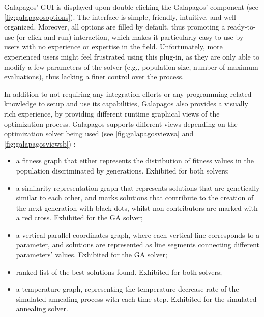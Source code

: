 	Galapagos' \ac{GUI} is displayed upon double-clicking the Galapagos' component (see \cref{fig:galapagosoptions}). The interface is simple, friendly, intuitive, and well-organized. Moreover, all options are filled by default, thus promoting a ready-to-use (or click-and-run) interaction, which makes it particularly easy to use by users with no experience or expertise in the field. Unfortunately, more experienced users might feel frustrated using this plug-in, as they are only able to modify a few parameters of the solver (e.g., population size, number of maximum evaluations), thus lacking a finer control over the process. 
	
	In addition to not requiring any integration efforts or any programming-related knowledge to setup and use its capabilities, Galapagos also provides a visually rich experience, by providing different runtime graphical views of the optimization process. Galapagos supports different views depending on the optimization solver being used (see \cref{fig:galapagosviewsa} and \cref{fig:galapagosviewsb}) :
	\begin{itemize}
		\item a fitness graph that either represents the distribution of fitness values in the population discriminated by generations. Exhibited for both solvers;
		\item a similarity representation graph that represents solutions that are genetically similar to each other, and marks solutions that contribute to the creation of the next generation with black dots, whilst non-contributors are marked with a red cross. Exhibited for the \ac{GA} solver;
		\item a vertical parallel coordinates graph, where each vertical line corresponds to a parameter, and solutions are represented as line segments connecting different parameters' values. Exhibited for the \ac{GA} solver;
		\item ranked list of the best solutions found. Exhibited for both solvers;
		\item a temperature graph, representing the temperature decrease rate of the simulated annealing process with each time step. Exhibited for the simulated annealing solver.
	\end{itemize}
	
